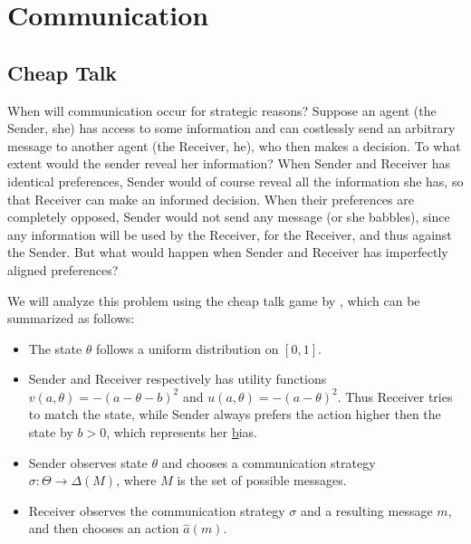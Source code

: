 \chapter{Communication}

\section{Cheap Talk}
When will communication occur for strategic reasons?
Suppose an agent (the Sender, she) has access to some information and can costlessly send an arbitrary message to another agent (the Receiver, he), who then makes a decision.
To what extent would the sender reveal her information?
When Sender and Receiver has identical preferences, Sender would of course reveal all the information she has, so that Receiver can make an informed decision.
When their preferences are completely opposed, Sender would not send any message (or she babbles), since any information will be used by the Receiver, for the Receiver, and thus against the Sender.
But what would happen when Sender and Receiver has imperfectly aligned preferences?

We will analyze this problem using the cheap talk game by \textcite{crawford1982StrategicInformation}, which can be summarized as follows:
\begin{itemize}
  \item The state \(\theta\) follows a uniform distribution on \([0, 1]\).
  \item Sender and Receiver respectively has utility functions \(v(a, \theta) = -(a - \theta - b)^2\) and \(u(a, \theta) = -(a - \theta)^2\).
    Thus Receiver tries to match the state, while Sender always prefers the action higher then the state by \(b > 0\), which represents her \underline{b}ias.
  \item Sender observes state \(\theta\) and chooses a communication strategy \(\sigma: \Theta \to \Delta(M)\), where \(M\) is the set of possible messages.
  \item Receiver observes the communication strategy \(\sigma\) and a resulting message \(m\), and then chooses an action \(\hat{a}(m)\).
\end{itemize}

